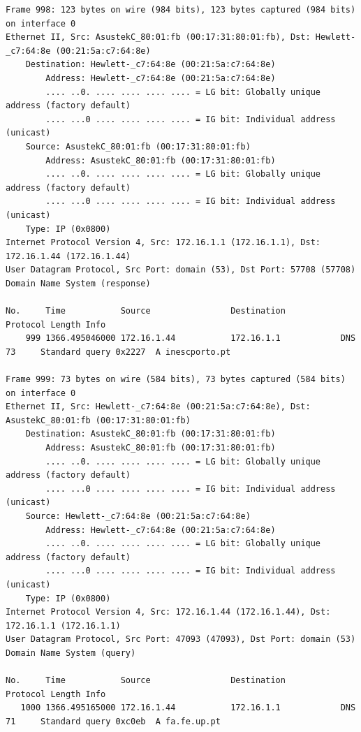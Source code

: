 \documentclass[a4paper,11pt]{article}
\begin{document}
\begin{lstlisting}
Frame 998: 123 bytes on wire (984 bits), 123 bytes captured (984 bits) on interface 0
Ethernet II, Src: AsustekC_80:01:fb (00:17:31:80:01:fb), Dst: Hewlett-_c7:64:8e (00:21:5a:c7:64:8e)
    Destination: Hewlett-_c7:64:8e (00:21:5a:c7:64:8e)
        Address: Hewlett-_c7:64:8e (00:21:5a:c7:64:8e)
        .... ..0. .... .... .... .... = LG bit: Globally unique address (factory default)
        .... ...0 .... .... .... .... = IG bit: Individual address (unicast)
    Source: AsustekC_80:01:fb (00:17:31:80:01:fb)
        Address: AsustekC_80:01:fb (00:17:31:80:01:fb)
        .... ..0. .... .... .... .... = LG bit: Globally unique address (factory default)
        .... ...0 .... .... .... .... = IG bit: Individual address (unicast)
    Type: IP (0x0800)
Internet Protocol Version 4, Src: 172.16.1.1 (172.16.1.1), Dst: 172.16.1.44 (172.16.1.44)
User Datagram Protocol, Src Port: domain (53), Dst Port: 57708 (57708)
Domain Name System (response)

No.     Time           Source                Destination           Protocol Length Info
    999 1366.495046000 172.16.1.44           172.16.1.1            DNS      73     Standard query 0x2227  A inescporto.pt

Frame 999: 73 bytes on wire (584 bits), 73 bytes captured (584 bits) on interface 0
Ethernet II, Src: Hewlett-_c7:64:8e (00:21:5a:c7:64:8e), Dst: AsustekC_80:01:fb (00:17:31:80:01:fb)
    Destination: AsustekC_80:01:fb (00:17:31:80:01:fb)
        Address: AsustekC_80:01:fb (00:17:31:80:01:fb)
        .... ..0. .... .... .... .... = LG bit: Globally unique address (factory default)
        .... ...0 .... .... .... .... = IG bit: Individual address (unicast)
    Source: Hewlett-_c7:64:8e (00:21:5a:c7:64:8e)
        Address: Hewlett-_c7:64:8e (00:21:5a:c7:64:8e)
        .... ..0. .... .... .... .... = LG bit: Globally unique address (factory default)
        .... ...0 .... .... .... .... = IG bit: Individual address (unicast)
    Type: IP (0x0800)
Internet Protocol Version 4, Src: 172.16.1.44 (172.16.1.44), Dst: 172.16.1.1 (172.16.1.1)
User Datagram Protocol, Src Port: 47093 (47093), Dst Port: domain (53)
Domain Name System (query)

No.     Time           Source                Destination           Protocol Length Info
   1000 1366.495165000 172.16.1.44           172.16.1.1            DNS      71     Standard query 0xc0eb  A fa.fe.up.pt


\end{lstlisting}
\end{document}
